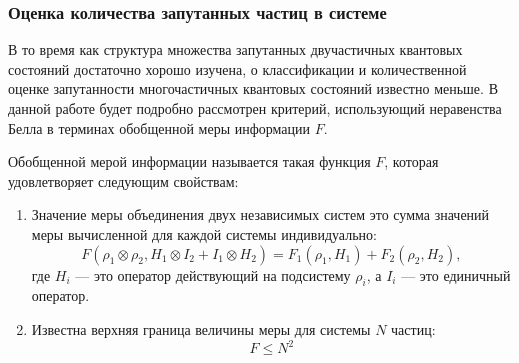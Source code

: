 



\subsubsection{Оценка количества запутанных частиц в системе}
\label{sec:manyparticle-entanglement-criteria}
В то время как структура множества запутанных двучастичных квантовых состояний достаточно хорошо изучена,
о классификации и количественной оценке запутанности многочастичных квантовых состояний известно меньше\cite{Plenio2007, Amico2008, Horodecki2009, Guhne2009}.
%
В данной работе будет подробно рассмотрен критерий,
использующий  неравенства Белла\cite{Bell1964} в терминах обобщенной меры информации $F$.

\begin{definition}\label{def:f}
Обобщенной мерой информации называется такая функция $F$,
которая удовлетворяет следующим свойствам:
\begin{enumerate}
  \item Значение меры объединения двух независимых систем это сумма значений меры вычисленной для каждой системы индивидуально:
  \begin{equation}\label{eq:f-additive-map}
    F(\rho_1 \otimes \rho_2 ,H_1 \otimes I_2 + I_1 \otimes H_2)
    = F_{1} (\rho_1, H_1) + F_{2} (\rho_2 , H_2),
  \end{equation}
  где $H_i$ --- это оператор действующий на подсистему $\rho_i$,
  а $I_i$ --- это единичный оператор.

  \item Известна верхняя граница величины меры для системы $N$ частиц:
  \begin{equation}\label{eq:f-supremum}
    F \leq N^2
  \end{equation}
\end{enumerate}
\end{definition}

